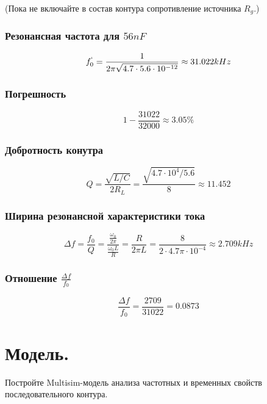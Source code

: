 \documentclass[12pt,a4paper]{article}
\begin{document}
	(Пока не включайте в состав контура сопротивление источника $R_g$.)
	
	\subsubsection*{Резонансная частота для $56 nF$}
		
		\[f^`_0 = \frac{1}{2\pi\sqrt{4.7 \cdot 5.6 \cdot 10^{-12}}} \approx 31.022 kHz\]
		
	\subsubsection*{Погрешность}
		
		\[1 - \frac{31022}{32000} \approx 3.05\% \]
		
	\subsubsection*{Добротность конутра}
	
		\[Q = \frac{\sqrt{L/C}}{2R_L} = \frac{\sqrt{4.7 \cdot 10^{4} / 5.6}}{8} \approx 11.452\]
		
	\subsubsection*{Ширина резонансной характеристики тока}
	
		\[\Delta f = \frac{f_0}{Q} = \frac{\frac{\omega_0}{2\pi}}{\frac{\omega_0 L}{R}} = \frac{R}{2\pi L} = \frac{8}{2 \cdot 4.7 \pi\cdot 10^{-4}} \approx 2.709 kHz\]
		
	\subsubsection*{Отношение $\frac{\Delta f}{f_0}$}
	
		\[\frac{\Delta f}{f_0} = \frac{2709}{31022} = 0.0873\]
	
	\newpage	
		
	\section{Модель.}
	Постройте Multisim-модель анализа частотных и временных свойств последовательного контура.
	
\end{document}
